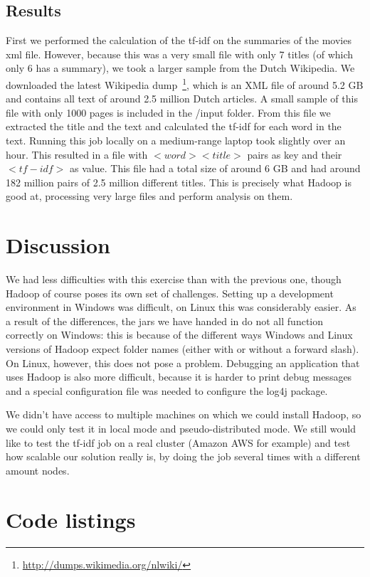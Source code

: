 \documentclass[11pt]{article}
\begin{document}
\subsection{Results}
First we performed the calculation of the tf-idf on the summaries of the movies xml file. However, because this was a very small file with only 7 titles (of which only 6 has a summary), we took a larger sample from the Dutch Wikipedia. We downloaded the latest Wikipedia dump~\footnote{\url{http://dumps.wikimedia.org/nlwiki/}}, which is an XML file of around 5.2 GB and contains all text of around 2.5 million Dutch articles. A small sample of this file with only 1000 pages is included in the /input folder. From this file we extracted the title and the text and calculated the tf-idf for each word in the text. Running this job locally on a medium-range laptop took slightly over an hour. This resulted in a file with $<word><title>$ pairs as key and their $<tf-idf>$ as value. This file had a total size of around 6 GB and had around 182 million pairs of 2.5 million different titles. This is precisely what Hadoop is good at, processing very large files and perform analysis on them.

\section{Discussion}
We had less difficulties with this exercise than with the previous one, though Hadoop of course poses its own set of challenges. Setting up a development environment in Windows was difficult, on Linux this was considerably easier. As a result of the differences, the jars we have handed in do not all function correctly on Windows: this is because of the different ways Windows and Linux versions of Hadoop expect folder names (either with or without a forward slash). On Linux, however, this does not pose a problem. Debugging an application that uses Hadoop is also more difficult, because it is harder to print debug messages and a special configuration file was needed to configure the log4j package.

We didn't have access to multiple machines on which we could install Hadoop, so we could only test it in local mode and pseudo-distributed mode. We still would like to test the tf-idf job on a real cluster (Amazon AWS for example) and test how scalable our solution really is, by doing the job several times with a different amount nodes.

\section{Code listings}





\end{document}
